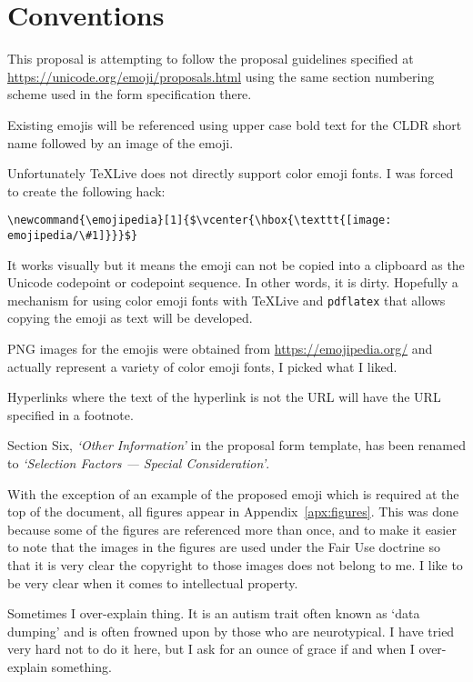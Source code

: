 \section*{Conventions}

This proposal is attempting to follow the proposal guidelines specified at
\url{https://unicode.org/emoji/proposals.html} using the same section numbering
scheme used in the form specification there.

Existing emojis will be referenced using upper case bold text for the CLDR short name
followed by an image of the emoji.

Unfortunately \TeX{}Live does not directly support color emoji fonts. I was forced to
create the following hack:

\begin{verbatim}
\newcommand{\emojipedia}[1]{$\vcenter{\hbox{\texttt{[image: emojipedia/\#1]}}}$}
\end{verbatim}

It works visually but it means the emoji can not be copied into a clipboard as the
Unicode codepoint or codepoint sequence. In other words, it is dirty. Hopefully a
mechanism for using color emoji fonts with \TeX{}Live and \texttt{pdflatex} that
allows copying the emoji as text will be developed.

PNG images for the emojis were obtained from \url{https://emojipedia.org/} and actually
represent a variety of color emoji fonts, I picked what I liked.

Hyperlinks where the text of the hyperlink is not the URL will have the URL specified
in a footnote.

Section Six, \textit{`Other Information'} in the proposal form template, has been renamed to
\textit{`Selection Factors --- Special Consideration'}.

With the exception of an example of the proposed emoji which is required at the top of
the document, all figures appear in Appendix~\ref{apx:figures}. This was done because
some of the figures are referenced more than once, and to make it easier to note that
the images in the figures are used under the Fair Use doctrine so that it is very
clear the copyright to those images does not belong to me. I like to be very clear
when it comes to intellectual property.

Sometimes I over-explain thing. It is an autism trait often known as `data dumping' and
is often frowned upon by those who are neurotypical. I have tried very hard not to do
it here, but I ask for an ounce of grace if and when I over-explain something.

